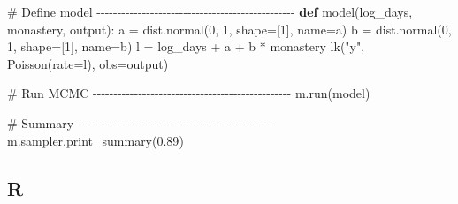 \documentclass[
  letterpaper,
  DIV=11,
  numbers=noendperiod]{scrreprt}
\newenvironment{Shaded}{\begin{snugshade}}{\end{snugshade}}
\newcommand{\CommentTok}[1]{\textcolor[rgb]{0.37,0.37,0.37}{#1}}
\newcommand{\DecValTok}[1]{\textcolor[rgb]{0.68,0.00,0.00}{#1}}
\newcommand{\FloatTok}[1]{\textcolor[rgb]{0.68,0.00,0.00}{#1}}
\newcommand{\KeywordTok}[1]{\textcolor[rgb]{0.00,0.23,0.31}{\textbf{#1}}}
\newcommand{\NormalTok}[1]{\textcolor[rgb]{0.00,0.23,0.31}{#1}}
\newcommand{\OperatorTok}[1]{\textcolor[rgb]{0.37,0.37,0.37}{#1}}
\newcommand{\StringTok}[1]{\textcolor[rgb]{0.13,0.47,0.30}{#1}}
\begin{document}
\begin{Shaded}
\begin{Highlighting}[]
\CommentTok{\# Define model {-}{-}{-}{-}{-}{-}{-}{-}{-}{-}{-}{-}{-}{-}{-}{-}{-}{-}{-}{-}{-}{-}{-}{-}{-}{-}{-}{-}{-}{-}{-}{-}{-}{-}{-}{-}{-}{-}{-}{-}{-}{-}{-}{-}{-}{-}{-}{-}}
\KeywordTok{def}\NormalTok{ model(log\_days, monastery, output):}
\NormalTok{    a }\OperatorTok{=}\NormalTok{ dist.normal(}\DecValTok{0}\NormalTok{, }\DecValTok{1}\NormalTok{, shape}\OperatorTok{=}\NormalTok{[}\DecValTok{1}\NormalTok{], name}\OperatorTok{=}\StringTok{\textquotesingle{}a\textquotesingle{}}\NormalTok{)}
\NormalTok{    b }\OperatorTok{=}\NormalTok{ dist.normal(}\DecValTok{0}\NormalTok{, }\DecValTok{1}\NormalTok{, shape}\OperatorTok{=}\NormalTok{[}\DecValTok{1}\NormalTok{], name}\OperatorTok{=}\StringTok{\textquotesingle{}b\textquotesingle{}}\NormalTok{)}
\NormalTok{    l }\OperatorTok{=}\NormalTok{ log\_days }\OperatorTok{+}\NormalTok{ a }\OperatorTok{+}\NormalTok{ b }\OperatorTok{*}\NormalTok{ monastery}
\NormalTok{    lk(}\StringTok{"y"}\NormalTok{, Poisson(rate}\OperatorTok{=}\NormalTok{l), obs}\OperatorTok{=}\NormalTok{output)}

\CommentTok{\# Run MCMC {-}{-}{-}{-}{-}{-}{-}{-}{-}{-}{-}{-}{-}{-}{-}{-}{-}{-}{-}{-}{-}{-}{-}{-}{-}{-}{-}{-}{-}{-}{-}{-}{-}{-}{-}{-}{-}{-}{-}{-}{-}{-}{-}{-}{-}{-}{-}{-}}
\NormalTok{m.run(model) }

\CommentTok{\# Summary {-}{-}{-}{-}{-}{-}{-}{-}{-}{-}{-}{-}{-}{-}{-}{-}{-}{-}{-}{-}{-}{-}{-}{-}{-}{-}{-}{-}{-}{-}{-}{-}{-}{-}{-}{-}{-}{-}{-}{-}{-}{-}{-}{-}{-}{-}{-}{-}}
\NormalTok{m.sampler.print\_summary(}\FloatTok{0.89}\NormalTok{)}
\end{Highlighting}
\end{Shaded}

\subsection{R}
\end{document}

